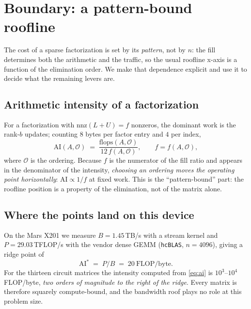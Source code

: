 \section{Boundary: a pattern-bound roofline}\label{sec:roofline}

The cost of a sparse factorization is set by its \emph{pattern}, not by $n$: the
fill determines both the arithmetic and the traffic, so the usual roofline
x-axis is a function of the elimination order. We make that dependence explicit
and use it to decide what the remaining levers are.

\subsection{Arithmetic intensity of a factorization}

For a factorization with $\mathrm{nnz}(L+U)=f$ nonzeros, the dominant work is
the rank-$b$ updates; counting $8$ bytes per factor entry and $4$ per index,
\begin{equation}
  \mathrm{AI}(A,\mathcal{O}) \;=\; \frac{\mathrm{flops}(A,\mathcal{O})}{12\,f(A,\mathcal{O})},
  \qquad f = f(A,\mathcal{O}),\label{eq:ai}
\end{equation}
where $\mathcal{O}$ is the ordering. Because $f$ is the numerator of the fill
ratio and appears in the denominator of the intensity, \emph{choosing an ordering
moves the operating point horizontally}: $\mathrm{AI}\propto 1/f$ at fixed work.
This is the ``pattern-bound'' part: the roofline position is a property of the
elimination, not of the matrix alone.

\subsection{Where the points land on this device}

On the Mars X201 we measure $B=1.45$\,TB/s with a stream kernel and
$P=29.03$\,TFLOP/s with the vendor dense GEMM (\texttt{hcBLAS}, $n=4096$), giving
a ridge point of
\begin{equation}
  \mathrm{AI}^\ast \;=\; P/B \;=\; 20\ \text{FLOP/byte}.
\end{equation}
For the thirteen circuit matrices the intensity computed from \eqref{eq:ai} is
$10^{3}$--$10^{4}$ FLOP/byte, \emph{two orders of magnitude to the right of the
ridge}. Every matrix is therefore squarely compute-bound, and the bandwidth roof
plays no role at this problem size.


